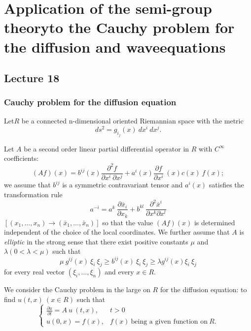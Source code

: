 \part[Application of the semi-group theory....]{Application of the semi-group theory\break to the Cauchy
 problem for the diffusion and wave\break equations}\label{chap18:p4}

\chapter{Lecture 18}\label{chap18} %

\section{Cauchy problem for the diffusion equation}\label{chap18:sec1}

 Let\pageoriginale $R$ be a connected n-dimensional oriented Riemannian space with
 the metric 
$$
ds^2 = g_{i_j}(x) ~ dx^i ~ dx^j.
$$

Let $A$ be a second order linear partial differential operator in $R$
with $C^\infty$ coefficients: 
$$
(Af)(x) = b^{ij}(x) \frac{\partial^2 f}{\partial x^i ~ \partial x^j} +
a^i (x) \frac{\partial f} {\partial x^i} ~ (x) c(x) ~ f(x); 
$$
we assume that $b^{ij}$ is a symmetric contravariant tensor and
$a^i(x)$ satisfies the transformation rule 
$$
a^{-i} = a^k ~ \frac{\partial \bar{x}_i}{\partial x_k} + b^{kl} ~
\frac{\partial^2 \bar{x}^i}{\partial x^k \partial x^l} 
$$
$[(x_1,\ldots,x_n) \rightarrow (\bar{x}_1,\ldots,\bar{x}_n)]$ so that
the value $(Af)(x)$ is determined independent of the choice of the
local coordinates. We further assume that $A$ is \textit{elliptic} in
the strong sense that there exist positive constants $\mu$ and
$\lambda (0 < \lambda < \mu)$ such that 
$$
\mu ~ g^{ij}(x) ~ \xi_i ~ \xi_j \ge b^{ij}(x) ~ \xi_{i} ~ \xi_j
\geq \lambda  g^{ij}(x) \xi_i ~ \xi_j 
$$
for every real vector $(\xi_i, \dots,\xi_n)$ and every $x \in R$.

We consider the Cauchy problem in the large on $R$ for the diffusion
equation: to find $u(t,x) ~ (x \in R)$ such that 
\begin{equation}
 \begin{cases}
  \frac{\partial u}{\partial t} = A ~ u ~ (t,x), & t > 0\\
  u(0,x) = f(x), & f(x) ~\text{being a given function on}~ R.
 \end{cases}
 \tag{**}
\end{equation}

